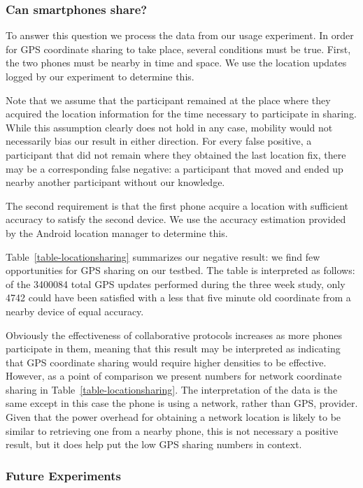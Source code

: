 \subsubsection{Can smartphones share?}

To answer this question we process the data from our usage experiment. In
order for GPS coordinate sharing to take place, several conditions must be
true. First, the two phones must be nearby in time and space. We use the
location updates logged by our experiment to determine this.

Note that we assume that the participant remained at the place where they
acquired the location information for the time necessary to participate in
sharing. While this assumption clearly does not hold in any case, mobility
would not necessarily bias our result in either direction. For every false
positive, a participant that did not remain where they obtained the last
location fix, there may be a corresponding false negative: a participant that
moved and ended up nearby another participant without our knowledge.

The second requirement is that the first phone acquire a location with
sufficient accuracy to satisfy the second device. We use the accuracy
estimation provided by the Android location manager to determine this.

Table~\ref{table-locationsharing} summarizes our negative result: we find few
opportunities for GPS sharing on our testbed. The table is interpreted as
follows: of the \num{3400084} total GPS updates performed during the three
week study, only \num{4742} could have been satisfied with a less that five
minute old coordinate from a nearby device of equal accuracy.

Obviously the effectiveness of collaborative protocols increases as more
phones participate in them, meaning that this result may be interpreted as
indicating that GPS coordinate sharing would require higher densities to be
effective. However, as a point of comparison we present numbers for network
coordinate sharing in Table~\ref{table-locationsharing}. The interpretation
of the data is the same except in this case the phone is using a network,
rather than GPS, provider. Given that the power overhead for obtaining a
network location is likely to be similar to retrieving one from a nearby
phone, this is not necessary a positive result, but it does help put the low
GPS sharing numbers in context.

\subsubsection{Future Experiments}

